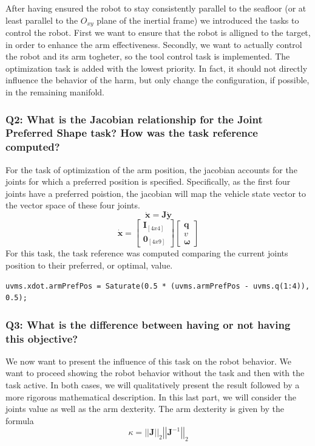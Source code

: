 \documentclass{article}
\begin{document}
After having ensured the robot to stay consistently parallel to the seafloor (or at least parallel to the $ O_{xy} $ plane of the inertial frame) we introduced the tasks to control the robot. First we want to ensure that the robot is alligned to the target, in order to enhance the arm effectiveness. Secondly, we want to actually control the robot and its arm togheter, so the tool control task is implemented. The optimization task is added with the lowest priority. In fact, it should not directly influence the behavior of the harm, but only change the configuration, if possible, in the remaining manifold. 

\subsubsection{Q2: What is the Jacobian relationship for the Joint Preferred Shape task? How was the task reference computed?}
For the task of optimization of the arm position, the jacobian accounts for the joints for which a preferred position is specified. Specifically, as the first four joints have a preferred poistion, the jacobian will map the vehicle state vector to the vector space of these four joints. 
$$
	\bm{\dot{x}} = \bm{J}\bm{\dot{y}}
$$ $$	
	\bm{\dot{x}} = \begin{bmatrix} \bm{I}_{[4x4]} \\ \bm{0}_{[4x9]} \end{bmatrix}         
	\begin{bmatrix} \bm{q}    \\ \bm{\textit{v}} \\ \bm{\omega} \end{bmatrix} 	   
$$
For this task, the task reference was computed comparing the current joints position to their preferred, or optimal, value. 
\begin{lstlisting}
uvms.xdot.armPrefPos = Saturate(0.5 * (uvms.armPrefPos - uvms.q(1:4)), 0.5);
\end{lstlisting}

\subsubsection{Q3: What is the difference between having or not having this objective?}

We now want to present the influence of this task on the robot behavior. We want to proceed showing the robot behavior without the task and then with the task active. In both cases, we will qualitatively present the result followed by a more rigorous mathematical description. In this last part, we will consider the joints value as well as the arm dexterity. The arm dexterity is given by the formula
$$ \kappa = \left|\left| \bm{J} \right|\right|_2 \left|\left| \bm{J}^{-1} \right|\right|_2
$$
\end{document}
